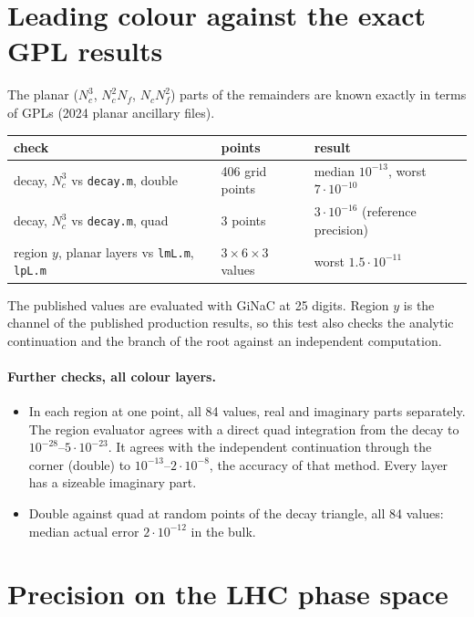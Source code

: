 \documentclass[11pt]{article}
\begin{document}
\section{Leading colour against the exact GPL results}
The planar ($N_c^3$, $N_c^2N_f$, $N_cN_f^2$) parts of the remainders are known exactly in terms of GPLs (2024 planar
ancillary files).
\begin{center}\small
\begin{tabular}{lll}\toprule
check & points & result \\ \midrule
decay, $N_c^3$ vs \texttt{decay.m}, double & 406 grid points & median $10^{-13}$, worst $7\cdot10^{-10}$ \\
decay, $N_c^3$ vs \texttt{decay.m}, quad & 3 points & $3\cdot10^{-16}$ (reference precision) \\
region $y$, planar layers vs \texttt{lmL.m}, \texttt{lpL.m} & $3\times6\times3$ values & worst $1.5\cdot10^{-11}$ \\
\bottomrule
\end{tabular}
\end{center}
The published values are evaluated with GiNaC at 25 digits.
Region $y$ is the channel of the published production results, so this test also checks the analytic continuation
and the branch of the root against an independent computation.

\paragraph{Further checks, all colour layers.}
\begin{itemize}
\item In each region at one point, all 84 values, real and imaginary parts separately. The region evaluator agrees
  with a direct quad integration from the decay to $10^{-28}$--$5\cdot10^{-23}$. It agrees with the independent
  continuation through the corner (double) to $10^{-13}$--$2\cdot10^{-8}$, the accuracy of that method. Every layer
  has a sizeable imaginary part.
\item Double against quad at random points of the decay triangle, all 84 values: median actual error $2\cdot10^{-12}$
  in the bulk.
\end{itemize}

\section{Precision on the LHC phase space}
\end{document}

